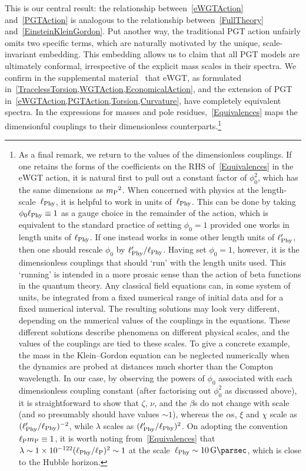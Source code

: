 \documentclass[aps,prd,reprint,preprintnumbers,showpacs,floatfix,nofootinbib,superscript address]{revtex4-2}
\begin{document}
This is our central result: the relationship between~\cref{eWGTAction} and~\cref{PGTAction} is analogous to the relationship between~\cref{FullTheory} and~\cref{EinsteinKleinGordon}. Put another way, the traditional PGT action unfairly omits two specific terms, which are naturally motivated by the unique, scale-invariant embedding. This embedding allows us to claim that all PGT models are ultimately conformal, irrespective of the explicit mass scales in their spectra. We confirm in the supplemental material~\cite{Barker:2024} that eWGT, as formulated in~\cref{TracelessTorsion,WGTAction,EconomicalAction}, and the extension of PGT in~\cref{eWGTAction,PGTAction,Torsion,Curvature}, have completely equivalent spectra. In the expressions for masses and pole residues,~\cref{Equivalences} maps the dimensionful couplings to their dimensionless counterparts.\footnote{As a final remark, we return to the values of the dimensionless couplings. If one retains the forms of the coefficients on the RHS of~\cref{Equivalences} in the eWGT action, it is natural first to pull out a constant factor of $\phi_0^2$, which has the same dimensions as ${m_{\mathrm{P}}}{}^2$. 
When concerned with physics at the length-scale~${\ell_{\mathrm{Phy}}}{}$, it is helpful to work in units of~${\ell_{\mathrm{Phy}}}{}$. This can be done by taking~$\phi_0{\ell_{\mathrm{Phy}}}{}\equiv 1$ as a gauge choice in the remainder of the action, which is equivalent to the standard practice of setting $\phi_0 = 1$ provided one works in length units of ${\ell_{\mathrm{Phy}}}{}$. If one instead works in some other length units of ${\ell^\prime_{\mathrm{Phy}}}{}$, then one should rescale $\phi_0$ by ${\ell^\prime_{\mathrm{Phy}}}{}/{\ell_{\mathrm{Phy}}}{}$. Having set $\phi_0=1$, however, it is the dimensionless couplings that should `run' with the length units used. This `running' is intended in a more prosaic sense than the action of beta functions in the quantum theory. Any classical field equations can, in some system of units, be integrated from a fixed numerical range of initial data and for a fixed numerical interval. The resulting solutions may look very different, depending on the numerical values of the couplings in the equations. These different solutions describe phenomena on different physical scales, and the values of the couplings are tied to these scales. To give a concrete example, the mass in the Klein--Gordon equation can be neglected numerically when the dynamics are probed at distances much shorter than the Compton wavelength. In our case, by observing the powers of $\phi_0$ associated with each dimensionless coupling constant (after factorising out $\phi^2_0$ as discussed above), it is straightforward to show that $\zeta$, $\nu$, and the $\beta$s do not change with scale (and so presumably should have values $\sim 1$), whereas the $\alpha$s, $\xi$ and $\chi$ scale as $({\ell^\prime_{\mathrm{Phy}}}{}/{\ell_{\mathrm{Phy}}}{})^{-2}$, while $\lambda$ scales as $({\ell^\prime_{\mathrm{Phy}}}{}/{\ell_{\mathrm{Phy}}}{})^2$. On adopting the convention~${\ell_{\mathrm{P}}}{}{m_{\mathrm{P}}}{}\equiv 1$, it is worth noting from~\cref{Equivalences} that $\lambda\sim\SI{1e-122}{}({\ell_{\mathrm{Phy}}}{}/{{\ell_{\mathrm{P}}}{}})^2 \sim 1$ at the scale~$\LPhy{}\sim\SI{10}{\giga\parsec}$, which is close to the Hubble horizon.}
\end{document}
